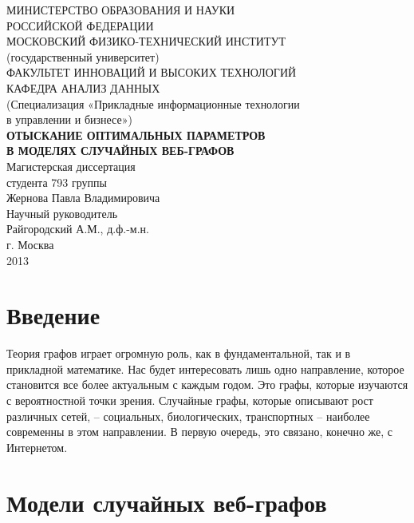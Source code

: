 \documentclass[14pt]{extreport}
\begin{document}

\begin{center}
МИНИСТЕРСТВО ОБРАЗОВАНИЯ И НАУКИ\\ РОССИЙСКОЙ ФЕДЕРАЦИИ\\[0.5cm]

МОСКОВСКИЙ ФИЗИКО-ТЕХНИЧЕСКИЙ ИНСТИТУТ\\
(государственный университет)\\[0.5cm]

ФАКУЛЬТЕТ ИННОВАЦИЙ И ВЫСОКИХ ТЕХНОЛОГИЙ\\
КАФЕДРА АНАЛИЗ ДАННЫХ\\[0.5cm]

(Специализация «Прикладные информационные технологии\\
в управлении и бизнесе»)\\[1.5cm]

{\bf ОТЫСКАНИЕ ОПТИМАЛЬНЫХ ПАРАМЕТРОВ}\\
{\bf В МОДЕЛЯХ СЛУЧАЙНЫХ ВЕБ-ГРАФОВ}\\[1.5cm]

Магистерская диссертация\\
студента 793 группы\\
Жернова Павла Владимировича\\[1.5cm]

Научный руководитель\\
Райгородский А.М., д.ф.-м.н.\\[3cm]


г. Москва\\
2013
\end{center}
\newpage
{} 
\setcounter{page}{2}
\tableofcontents
\newpage

\chapter{Введение}

Теория графов играет огромную роль, как в фундаментальной, так и в прикладной математике. Нас будет интересовать лишь одно направление, которое становится все более актуальным с каждым годом. Это графы, которые изучаются с вероятностной точки зрения. Случайные графы, которые описывают рост различных сетей, – социальных, биологических, транспортных – наиболее современны в этом направлении. В первую очередь, это связано, конечно же, с Интернетом.

\chapter{Модели случайных веб-графов}
\end{document}
